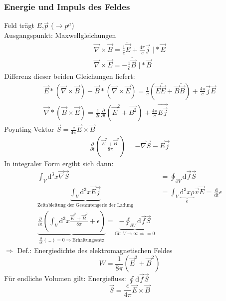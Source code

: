 \documentclass[a4paper]{article}
\begin{document}
\subsubsection{Energie und Impuls des Feldes}
Feld trägt $E$,$\vec{p}$ ($\rightarrow p^\mu$)\\
Ausgangspunkt: Maxwellgleichungen
\begin{align}
\vec{\nabla}\times\vec{B}=\frac{1}{c}\ddot{\vec{E}}+\frac{4\pi}{c}\vec{j}
\text{    |}*\vec{E}\\
\vec{\nabla}\times\vec{E}=-\frac{1}{c}\ddot{\vec{B}} \text{    |}*\vec{B}
\end{align}
Differenz dieser beiden Gleichungen liefert:
\begin{align}
\vec{E}*\left(\vec{\nabla}\times\vec{B}\right)-\vec{B}*\left(\vec{\nabla}
\times\vec{E}\right)=\frac{1}{c}(\vec{E}\ddot{\vec{E}}+\vec{B}\ddot{\vec{B}})
+\frac{4\pi}{c}\vec{j}\vec{E}\\
\vec{\nabla}*\left( \vec{B}\times\vec{E}\right)=\frac{1}{2c}
\frac{\partial}{\partial t}(\vec{E}^2+\vec{B^2})+\frac{4\pi}{c}\vec{E\vec{j}}
\end{align} 
Poynting-Vektor $\vec{S}=\frac{c}{4\pi}\vec{E}\times\vec{B}$
\begin{align}
\frac{\partial}{\partial t}\left( \frac{\vec{E}^2+\vec{B}^2}{8\pi} \right)
=-\vec{\nabla}\vec{S}-\vec{E}\vec{j}
\end{align}
In integraler Form ergibt sich dann:
\begin{align}
\int_V \mathrm{d}^3x \vec{\nabla}\vec{S}&=\oint_{\partial V}\mathrm{d}\!\vec{f}\vec{S}\\
\underbrace{\int_V \mathrm{d}^3x \vec{E}\vec{j}}_{\text{Zeitableitung der Gesamtengerie
der Ladung}}&=\int_V
\underbrace{\mathrm{d}^3x\rho}_{e}\vec{v}\vec{E}=\frac{\mathrm{d}}{\mathrm{d}t}\epsilon\\
\underbrace{\frac{\partial}{\partial t}\left(\int_V \mathrm{d}^3x
\frac{\vec{E}^2+\vec{B}^2}{8\pi} +\epsilon
\right)}_{\frac{\partial}{\partial t}\left( \ldots \right)=0 \Rightarrow
\text{Erhaltungssatz}} =\underbrace{-\oint_{\partial
V}\mathrm{d}\vec{f}\vec{S}}_{\text{für } V\rightarrow\infty \Rightarrow =0}
\end{align}
$\Rightarrow$ Def.: Energiedichte des elektromagnetischen Feldes
\begin{equation}
W=\frac{1}{8\pi}(\vec{E}^2+\vec{B}^2)
\end{equation}
Für endliche Volumen gilt: Energiefluss: $\oint \mathrm{d}\vec{f}\vec{S}$
\begin{equation}
\vec{S}=\frac{c}{4\pi}\vec{E}\times\vec{B}
\end{equation}
\end{document}
